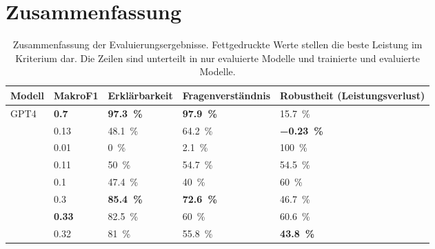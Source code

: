 \section{Zusammenfassung}\label{sec:results:summary}

\begin{table}
    \centering
    \begin{adjustbox}{width=1.2\textwidth,center}
        \begin{tabular}{lllll}
            \toprule
            \textbf{Modell} & \textbf{MakroF1}                   & \textbf{Erklärbarkeit}                      & \textbf{Fragenverständnis}                  & \textbf{Robustheit (Leistungsverlust)}       \\
            \midrule
            GPT4            & \textbf{\num[detect-weight]{0.7}}  & \textbf{\SI[detect-weight]{97.3}{\percent}} & \textbf{\SI[detect-weight]{97.9}{\percent}} & \SI{15.7}{\percent}                          \\
            \lo{}           & \num{0.13}                         & \SI{48.1}{\percent}                         & \SI{64.2}{\percent}                         & \textbf{\SI[detect-weight]{-0.23}{\percent}} \\
            \midrule
            \liv{}          & \num{0.01}                         & \SI{0}{\percent}                            & \SI{2.1}{\percent}                          & \SI{100}{\percent}                           \\
            \lia{}          & \num{0.11}                         & \SI{50}{\percent}                           & \SI{54.7}{\percent}                         & \SI{54.5}{\percent}                          \\
            \lev{}          & \num{0.1}                          & \SI{47.4}{\percent}                         & \SI{40}{\percent}                           & \SI{60}{\percent}                            \\
            \lea{}          & \num{0.3}                          & \textbf{\SI[detect-weight]{85.4}{\percent}} & \textbf{\SI[detect-weight]{72.6}{\percent}} & \SI{46.7}{\percent}                          \\
            \lsa{}          & \textbf{\num[detect-weight]{0.33}} & \SI{82.5}{\percent}                         & \SI{60}{\percent}                          & \SI{60.6}{\percent}                          \\
            \lioa{}         & \num{0.32}                         & \SI{81}{\percent}                           & \SI{55.8}{\percent}                         & \textbf{\SI[detect-weight]{43.8}{\percent}}  \\
        \end{tabular}
    \end{adjustbox}
        \caption[Zusammenfassung der Evaluierungsergebnisse]{Zusammenfassung der Evaluierungsergebnisse. Fettgedruckte Werte stellen die beste Leistung im Kriterium dar. Die Zeilen sind unterteilt in nur evaluierte Modelle und trainierte und evaluierte Modelle. }\label{tab:results:summary}
    \end{table}
    
